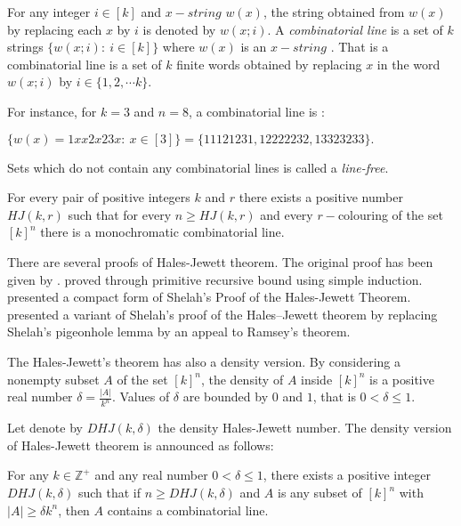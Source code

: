 For any integer $i \in [k]$ and $x-string$ $w(x)$, the string obtained from $w(x)$ by replacing each $x$ by $i$ is denoted by $w(x;i).$ 
A \textit{combinatorial line} is a set of $k$ strings $\{w(x;i): \  i\in [k] \}$ where $w(x)$ is an $x-string$ \citep{beck2008combinatorial}. That is a combinatorial line is a set of $k$ finite words obtained by replacing $x$ in the word $w(x;i)$ by $i \in \{1,2, \cdots k\}.$

For instance, for $k=3$ and $n=8$, a combinatorial line is :

 $\{w(x)=1xx2x23x: \ x\in [3]\}=  \{11121231, 12222232, 13323233 \}.$

Sets which do not contain any combinatorial lines is called a \textit{line-free}. 

\begin{thm}   For every pair of positive integers $k$ and $r$ there exists a positive number $HJ(k, r)$ such that for every $n \geq HJ(k, r)$ and every $r-$colouring of the set $[k]^n$ there is a
monochromatic combinatorial line.   \label{hj1} 	\end{thm}

There are several proofs of Hales-Jewett theorem. The original proof has been given by \cite{hales1987regularity}. \cite{shelah1988primitive} proved through primitive recursive bound using simple induction. \cite{nilli1990shelah} presented a compact form of Shelah’s Proof of the Hales-Jewett Theorem. \cite{matet2007shelah} presented a variant of Shelah’s proof of the Hales–Jewett theorem by replacing Shelah’s pigeonhole lemma by an appeal to Ramsey’s theorem.

The Hales-Jewett's theorem has also a density version. By considering a nonempty subset  $A$ of the set $[k]^n$, the density of $A$ inside $[k]^n$ is a positive real number $\delta=\frac{|A|}{k^n}$. Values of $\delta$ are bounded by $0$ and $1$, that is $0< \delta \leq 1.$ 

Let denote by $DHJ(k, \delta)$ the density Hales-Jewett number. The density version of Hales-Jewett theorem is announced as follows:

\begin{thm}   For any $k \in \mathbb{Z}^+$ and any real number $0< \delta \leq 1$,  there exists a positive integer $DHJ(k, \delta)$ such that if $n \geq DHJ(k,\delta)$ and $A$ is any subset of $[k] ^n$ with $|A| \geq \delta k^n$, then $A$ contains a combinatorial line.  \label{hj2}	\end{thm}

